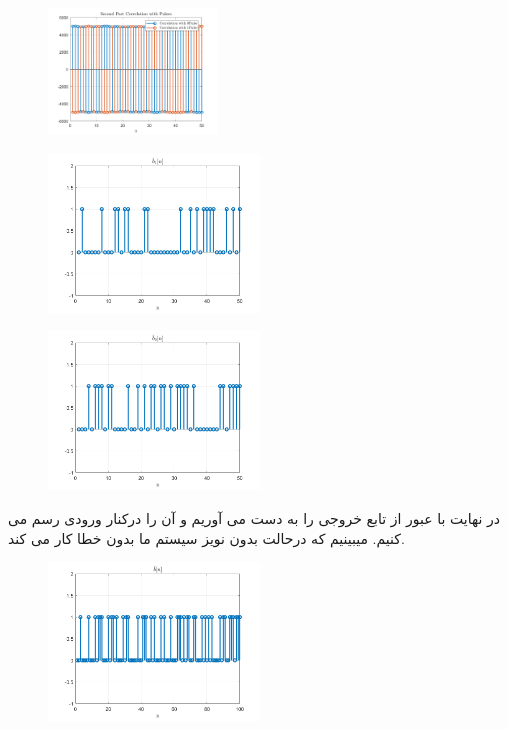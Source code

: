 \documentclass[a4paper]{article}
\begin{document}
	\begin{figure}[h!]
		\includegraphics[width=0.4\textwidth]{comsys_fig12.png}\\ 
		\centering
	\end{figure}
	\begin{figure}[h!]
		\includegraphics[width=0.5\textwidth]{comsys_fig13.png}\\ 
		\centering
	\end{figure}
	\begin{figure}[h!]
		\includegraphics[width=0.5\textwidth]{comsys_fig14.png}\\ 
		\centering
	\end{figure}
	\newpage
	در نهایت با عبور از تابع  خروجی را به دست می آوریم و آن را درکنار ورودی رسم می کنیم. میبینیم که درحالت بدون نویز سیستم ما بدون خطا کار می کند.
	\newline
	\begin{figure}[h!]
		\includegraphics[width=0.5\textwidth]{comsys_fig15.png}\\ 
		\centering
	\end{figure}
\end{document}

